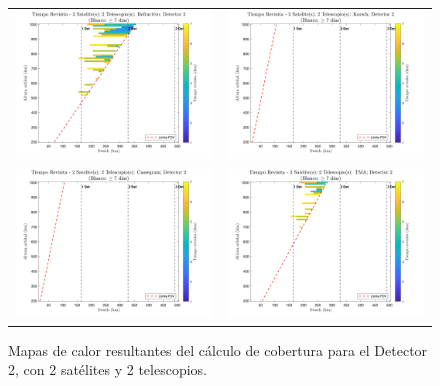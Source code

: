 \begin{landscape}
\begin{figure}[p]
\centering
\vspace*{0.3cm}
\setlength{\tabcolsep}{4pt}
\renewcommand{\arraystretch}{0}
\begin{tabular}{cc}
\includegraphics[width=0.48\linewidth]{4.Payload/Coverage/heatmap_2 Satelite(s); 2 Telescopio(s): Refractivo; Detector 2.jpg} &
\includegraphics[width=0.48\linewidth]{4.Payload/Coverage/heatmap_2 Satelite(s); 2 Telescopio(s): Korsch; Detector 2.jpg} \\
\includegraphics[width=0.48\linewidth]{4.Payload/Coverage/heatmap_2 Satelite(s); 2 Telescopio(s): Cassegrain; Detector 2.jpg} &
\includegraphics[width=0.48\linewidth]{4.Payload/Coverage/heatmap_2 Satelite(s); 2 Telescopio(s): TMA; Detector 2.jpg} \\
\end{tabular}
\caption{Mapas de calor resultantes del cálculo de cobertura para el Detector 2, con 2 satélites y 2 telescopios.}
\end{figure}
\end{landscape}

